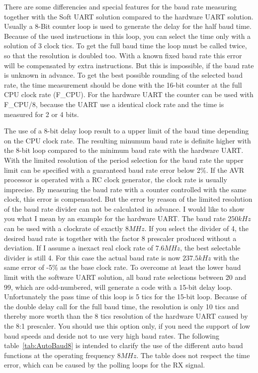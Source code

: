 There are some differencies and special features for the baud rate measuring
together with the Soft UART solution compared to the hardware UART solution.
Usually a 8-Bit counter loop is used to generate the delay for the half baud time.
Because of the used instructions in this loop, you can select the time
only with a solution of 3 clock tics.
To get the full baud time the loop must be called twice, so that
the resolution is doubled too.
With a known fixed baud rate this error will be compensated by extra instructions.
But this is impossible, if the baud rate  is unknown in advance.
To get the best possible rounding of the selected baud rate,
the time measurement should be done with the 16-bit counter at the full CPU clock rate (F\_CPU).
For the hardware UART the counter can be used with F\_CPU/8, because the UART
use a identical clock rate and the time is measured for 2 or 4 bits.

The use of a 8-bit delay loop result to a upper limit of the baud time
depending on the CPU clock rate.
The resulting minumum baud rate is definite higher with the 8-bit loop
compared to the minimum baud rate with the hardware UART.
With the limited resolution of the period selection for the baud rate
the upper limit can be specified with a guaranteed baud rate error below 2\%.
If the AVR processor is operated with a RC clock generator, the clock rate
is usually imprecise. By measuring the baud rate with a counter controlled
with the same clock, this error is compensated.
But the error by reason of the limited resolution of the baud rate divider 
can not be calculated in advance.
I would like to show you what I mean by an example for the hardware UART. 
The baud rate \(250kHz\) can be used with a clockrate of exactly \(8MHz\).
If you select the divider of 4, the desired baud rate is together with
the factor 8 prescaler produced without a deviation.
If I assume a inexact real clock rate of \(7.6MHz\),
the best selectable divider is still 4.
For this case the actual baud rate is now \(237.5kHz\) with the same
error of -5\% as the base clock rate.
To overcome at least the lower baud limit with the software UART solution,
all baud rate selections between 20 and 99, which are odd-numbered,
will generate a code with a 15-bit delay loop.
Unfortunately the pass time of this loop is 5 tics for the 15-bit loop.
Because of the double delay call for the full baud time,
the resolution is only 10 tics and thereby more worth than the 
8 tics resolution of the hardware UART caused by the 8:1 prescaler.
You should use this option only, if you need the support of low baud speeds
and deside not to use very high baud rates.
The following table~\ref{tab:AutoBaud8} is intended to clarify the use of
the different auto baud functions at the operating frequency \(8MHz\).
The table does not respect the time error, which can be caused by the
polling loops for the RX signal.

